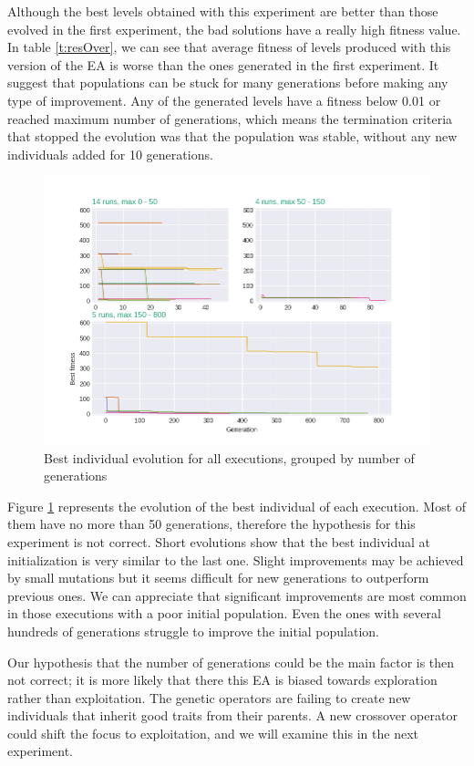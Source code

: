 \documentclass[runningheads,a4paper]{llncs}
\begin{document}
Although the best levels obtained with this experiment are better than those 
evolved in the first experiment, the bad solutions have a really high fitness 
value. In table \ref{t:resOver}, we can see that average fitness of levels 
produced with this version of the EA is worse than the ones generated in the 
first experiment. It suggest that populations can be stuck for many generations 
before making any type of improvement. Any of the generated levels have a 
fitness below 0.01 or reached maximum number of generations, which means the 
termination criteria that stopped the evolution was that the population was 
stable, without any new individuals added for 10 generations. 
\begin{figure}[H]
	\centering
	\includegraphics[scale=0.5]{exp2_explication.png}
	\caption{Best individual evolution for all executions, grouped by number of 
	generations}\label{f:grahp2}
\end{figure}
Figure \ref{f:grahp2} represents the evolution of the best individual of each 
execution. Most of them have no more than 50 generations, therefore the 
hypothesis for this experiment is not correct. Short evolutions show that the 
best individual at initialization is very similar to the last one. Slight 
improvements may be achieved by small mutations but it seems difficult for new 
generations to outperform previous ones. We can appreciate that significant 
improvements are most common in those executions with a poor initial 
population. Even the ones with several hundreds of generations struggle to 
improve the initial population.

Our hypothesis that the number of generations could be the main factor
is then not correct; it is more likely that there this EA is biased towards 
exploration rather than exploitation. The genetic operators are failing to 
create new individuals that inherit good traits from their parents. A new 
crossover operator could shift the focus to exploitation, and we will
examine this in the next experiment.
\end{document}
